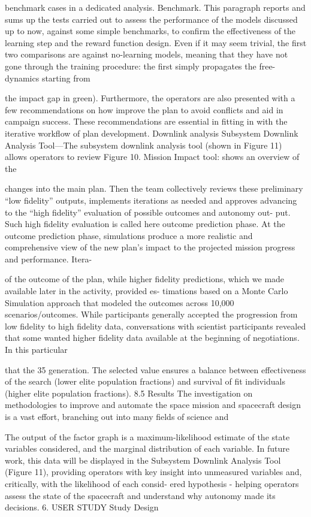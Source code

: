\documentclass[a4paper,12pt]{article}
\begin{document}
benchmark cases in a dedicated analysis.
Benchmark.
This paragraph reports and sums up the tests carried out to
assess the performance of the models discussed up to now, against some simple
benchmarks, to confirm the effectiveness of the learning step and the reward
function design. Even if it may seem trivial, the first two comparisons are
against no-learning models, meaning that they have not gone through the
training procedure: the first simply propagates the free-dynamics starting from

the impact gap in green). Furthermore, the operators are also
presented with a few recommendations on how improve the
plan to avoid conﬂicts and aid in campaign success. These
recommendations are essential in ﬁtting in with the iterative
workﬂow of plan development.
Downlink analysis
Subsystem Downlink Analysis Tool—The subsystem downlink
analysis tool (shown in Figure 11) allows operators to review
Figure 10. Mission Impact tool: shows an overview of the

changes into the main plan.
Then the team collectively
reviews these preliminary “low ﬁdelity” outputs, implements
iterations as needed and approves advancing to the “high
ﬁdelity” evaluation of possible outcomes and autonomy out-
put.
Such high ﬁdelity evaluation is called here outcome
prediction phase.
At the outcome prediction phase, simulations produce a more
realistic and comprehensive view of the new plan’s impact
to the projected mission progress and performance. Itera-

of the outcome of the plan, while higher ﬁdelity predictions,
which we made available later in the activity, provided es-
timations based on a Monte Carlo Simulation approach that
modeled the outcomes across 10,000 scenarios/outcomes.
While participants generally accepted the progression from
low ﬁdelity to high ﬁdelity data, conversations with scientist
participants revealed that some wanted higher ﬁdelity data
available at the beginning of negotiations. In this particular

that the 35%
generation. The selected value ensures a balance between effectiveness of the 
search (lower elite population fractions) and survival of fit individuals (higher elite 
population fractions). 
8.5 Results 
The investigation on methodologies to improve and automate the space mission and 
spacecraft design is a vast effort, branching out into many fields of science and

The output of the factor graph is a maximum-likelihood
estimate of the state variables considered, and the marginal
distribution of each variable. In future work, this data will be
displayed in the Subsystem Downlink Analysis Tool (Figure
11), providing operators with key insight into unmeasured
variables and, critically, with the likelihood of each consid-
ered hypothesis - helping operators assess the state of the
spacecraft and understand why autonomy made its decisions.
6. USER STUDY
Study Design
\end{document}
